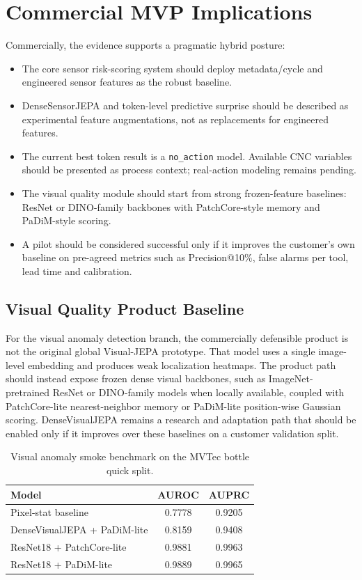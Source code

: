 \documentclass[10pt,journal,compsoc]{IEEEtran}
\begin{document}
\section{Commercial MVP Implications}
Commercially, the evidence supports a pragmatic hybrid posture:
\begin{itemize}
    \item The core sensor risk-scoring system should deploy metadata/cycle and engineered sensor features as the robust baseline.
    \item DenseSensorJEPA and token-level predictive surprise should be described as experimental feature augmentations, not as replacements for engineered features.
    \item The current best token result is a \texttt{no\_action} model. Available CNC variables should be presented as process context; real-action modeling remains pending.
    \item The visual quality module should start from strong frozen-feature baselines: ResNet or DINO-family backbones with PatchCore-style memory and PaDiM-style scoring.
    \item A pilot should be considered successful only if it improves the customer's own baseline on pre-agreed metrics such as Precision@10\%, false alarms per tool, lead time and calibration.
\end{itemize}

\subsection{Visual Quality Product Baseline}
For the visual anomaly detection branch, the commercially defensible product is not the original global Visual-JEPA prototype. That model uses a single image-level embedding and produces weak localization heatmaps. The product path should instead expose frozen dense visual backbones, such as ImageNet-pretrained ResNet or DINO-family models when locally available, coupled with PatchCore-lite nearest-neighbor memory or PaDiM-lite position-wise Gaussian scoring. DenseVisualJEPA remains a research and adaptation path that should be enabled only if it improves over these baselines on a customer validation split.

\begin{table}[t]
\centering
\caption{Visual anomaly smoke benchmark on the MVTec bottle quick split.}
\label{tab:visual_smoke}
\footnotesize
\setlength{\tabcolsep}{3pt}
\renewcommand{\arraystretch}{1.10}
\begin{tabularx}{\columnwidth}{@{}Y c c@{}}
\toprule
Model & AUROC & AUPRC \\
\midrule
Pixel-stat baseline & 0.7778 & 0.9205 \\
DenseVisualJEPA + PaDiM-lite & 0.8159 & 0.9408 \\
ResNet18 + PatchCore-lite & 0.9881 & 0.9963 \\
ResNet18 + PaDiM-lite & 0.9889 & 0.9965 \\
\bottomrule
\end{tabularx}
\end{table}
\end{document}
